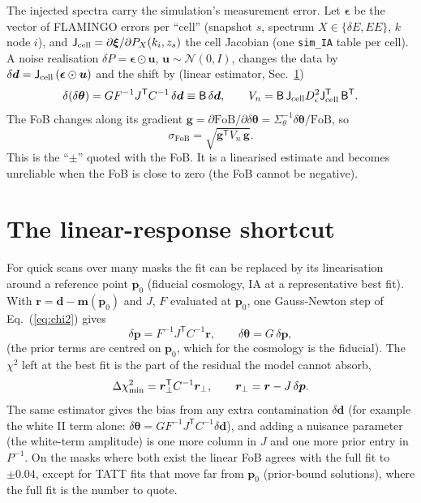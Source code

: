 \documentclass[11pt]{article}
\newcommand{\vd}{\bm{d}}
\newcommand{\vm}{\bm{m}}
\newcommand{\vp}{\bm{p}}
\newcommand{\vr}{\bm{r}}
\newcommand{\vth}{\bm{\theta}}
\newcommand{\tp}{^{\mathsf T}}
\newcommand{\fob}{\mathrm{FoB}}
\begin{document}
The injected spectra carry the simulation's measurement error. Let
$\bm{\epsilon}$ be the vector of FLAMINGO errors per ``cell'' (snapshot $s$,
spectrum $X \in \{\delta E, EE\}$, $k$ node $i$), and
$\mathsf{J}_{\rm cell} = \partial\bm{\xi}/\partial P_X(k_i, z_s)$ the cell
Jacobian (one \texttt{sim\_IA} table per cell). A noise realisation
$\delta P = \bm{\epsilon}\odot\bm{u}$, $\bm{u} \sim \mathcal{N}(0, I)$, changes
the data by $\delta\vd = \mathsf{J}_{\rm cell}\,(\bm{\epsilon}\odot\bm{u})$ and the
shift by (linear estimator, Sec.~\ref{sec:linear})
\begin{equation}
\delta(\delta\vth) = G F^{-1} J\tp C^{-1}\,\delta\vd \equiv \mathsf{B}\,\delta\vd ,
\qquad
V_n = \mathsf{B}\,\mathsf{J}_{\rm cell} D_\epsilon^2 \mathsf{J}_{\rm cell}\tp\,\mathsf{B}\tp .
\end{equation}
The FoB changes along its gradient $\bm{g} = \partial\fob/\partial\delta\vth
= \Sigma_\theta^{-1}\delta\vth/\fob$, so
\begin{equation}
\sigma_{\fob} = \sqrt{\bm{g}\tp V_n\,\bm{g}} .
\end{equation}
This is the ``$\pm$'' quoted with the FoB. It is a linearised estimate and
becomes unreliable when the FoB is close to zero (the FoB cannot be
negative).

\section{The linear-response shortcut}\label{sec:linear}

For quick scans over many masks the fit can be replaced by its linearisation
around a reference point $\vp_0$ (fiducial cosmology, IA at a representative
best fit). With $\vr = \vd - \vm(\vp_0)$ and $J$, $F$ evaluated at $\vp_0$,
one Gauss-Newton step of Eq.~(\ref{eq:chi2}) gives
\begin{equation}
\delta\vp = F^{-1}J\tp C^{-1}\vr,\qquad \delta\vth = G\,\delta\vp,
\label{eq:linshift}
\end{equation}
(the prior terms are centred on $\vp_0$, which for the cosmology is the
fiducial). The $\chi^2$ left at the best fit is the part of the residual the
model cannot absorb,
\begin{equation}
\Delta\chi^2_{\rm min} = \vr_\perp\tp C^{-1}\vr_\perp,\qquad
\vr_\perp = \vr - J\,\delta\vp .
\end{equation}
The same estimator gives the bias from any extra contamination
$\delta\vd$ (for example the white II term alone: $\delta\vth = G F^{-1}J\tp
C^{-1}\delta\vd$), and adding a nuisance parameter (the white-term amplitude)
is one more column in $J$ and one more prior entry in $P^{-1}$. On the masks
where both exist the linear FoB agrees with the full fit to $\pm0.04$,
except for TATT fits that move far from $\vp_0$ (prior-bound solutions),
where the full fit is the number to quote.
\end{document}
